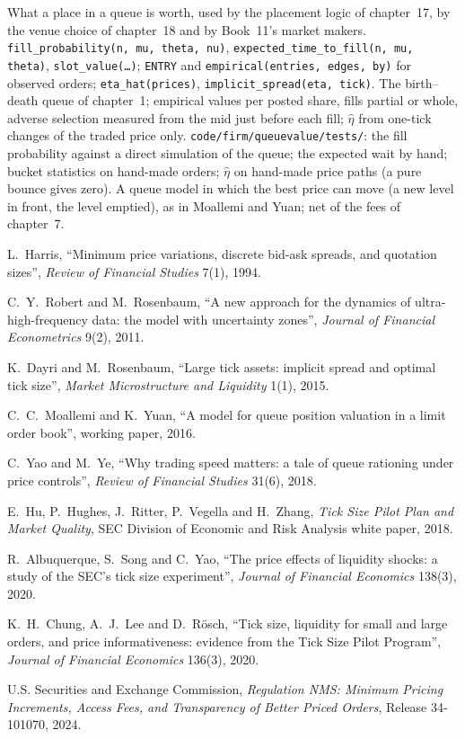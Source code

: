 \begin{build}
 What a place in a queue is worth, used by the placement logic of chapter~17, by the venue choice of chapter~18 and by Book~11's
market makers.
 \texttt{fill\_probability(n, mu, theta, nu)}, \texttt{expected\_time\_to\_fill(n, mu, theta)}, \texttt{slot\_value(\dots)};
\texttt{ENTRY} and \texttt{empirical(entries, edges, by)} for observed orders; \texttt{eta\_hat(prices)}, \texttt{implicit\_spread(eta, tick)}.
 The birth--death queue of chapter~1; empirical values per posted share, fills partial or whole, adverse selection measured from the mid
just before each fill; $\hat\eta$ from one-tick changes of the traded price only.
 \texttt{code/firm/queuevalue/tests/}: the fill probability against a direct simulation of the queue; the expected wait by hand;
bucket statistics on hand-made orders; $\hat\eta$ on hand-made price paths (a pure bounce gives zero).
 A queue model in which the best price can move (a new level in front, the level emptied), as in Moallemi and Yuan;  net of
the fees of chapter~7.
\end{build}

\begin{omsources}
\item L.~Harris, ``Minimum price variations, discrete bid-ask spreads, and quotation sizes'', \emph{Review of Financial Studies} 7(1), 1994.
\item C.~Y.~Robert and M.~Rosenbaum, ``A new approach for the dynamics of ultra-high-frequency data: the model with uncertainty zones'', \emph{Journal of
Financial Econometrics} 9(2), 2011.
\item K.~Dayri and M.~Rosenbaum, ``Large tick assets: implicit spread and optimal tick size'', \emph{Market Microstructure and Liquidity} 1(1), 2015.
\item C.~C.~Moallemi and K.~Yuan, ``A model for queue position valuation in a limit order book'', working paper, 2016.
\item C.~Yao and M.~Ye, ``Why trading speed matters: a tale of queue rationing under price controls'', \emph{Review of Financial Studies} 31(6), 2018.
\item E.~Hu, P.~Hughes, J.~Ritter, P.~Vegella and H.~Zhang, \emph{Tick Size Pilot Plan and Market Quality}, SEC Division of Economic and Risk Analysis
white paper, 2018.
\item R.~Albuquerque, S.~Song and C.~Yao, ``The price effects of liquidity shocks: a study of the SEC's tick size experiment'', \emph{Journal of Financial
Economics} 138(3), 2020.
\item K.~H.~Chung, A.~J.~Lee and D.~Rösch, ``Tick size, liquidity for small and large orders, and price informativeness: evidence from the Tick Size Pilot
Program'', \emph{Journal of Financial Economics} 136(3), 2020.
\item U.S. Securities and Exchange Commission, \emph{Regulation NMS: Minimum Pricing Increments, Access Fees, and Transparency of Better Priced Orders},
Release 34-101070, 2024.
\end{omsources}

